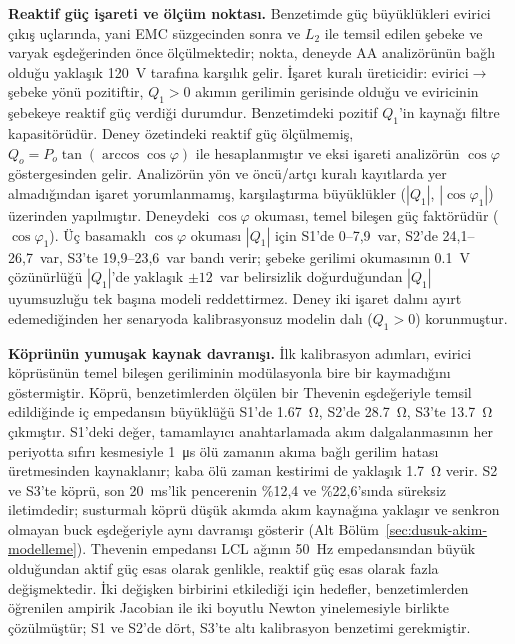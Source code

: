 \textbf{Reaktif güç işareti ve ölçüm noktası.} Benzetimde güç büyüklükleri evirici çıkış uçlarında, yani EMC süzgecinden sonra ve $L_2$ ile temsil edilen şebeke ve varyak eşdeğerinden önce ölçülmektedir; nokta, deneyde AA analizörünün bağlı olduğu yaklaşık \SI{120}{\volt} tarafına karşılık gelir. İşaret kuralı üreticidir: evirici$\rightarrow$şebeke yönü pozitiftir, $Q_1>0$ akımın gerilimin gerisinde olduğu ve eviricinin şebekeye reaktif güç verdiği durumdur. Benzetimdeki pozitif $Q_1$'in kaynağı filtre kapasitörüdür. Deney özetindeki reaktif güç ölçülmemiş, $Q_o=P_o\tan(\arccos\cos\varphi)$ ile hesaplanmıştır ve eksi işareti analizörün $\cos\varphi$ göstergesinden gelir. Analizörün yön ve öncü/artçı kuralı kayıtlarda yer almadığından işaret yorumlanmamış, karşılaştırma büyüklükler ($|Q_1|$, $|\cos\varphi_1|$) üzerinden yapılmıştır. Deneydeki $\cos\varphi$ okuması, temel bileşen güç faktörüdür ($\cos\varphi_1$). Üç basamaklı $\cos\varphi$ okuması $|Q_1|$ için S1'de 0--7,9~var, S2'de 24,1--26,7~var, S3'te 19,9--23,6~var bandı verir; şebeke gerilimi okumasının \SI{0.1}{\volt} çözünürlüğü $|Q_1|$'de yaklaşık $\pm12$~var belirsizlik doğurduğundan $|Q_1|$ uyumsuzluğu tek başına modeli reddettirmez. Deney iki işaret dalını ayırt edemediğinden her senaryoda kalibrasyonsuz modelin dalı ($Q_1>0$) korunmuştur.

\textbf{Köprünün yumuşak kaynak davranışı.} İlk kalibrasyon adımları, evirici köprüsünün temel bileşen geriliminin modülasyonla bire bir kaymadığını göstermiştir. Köprü, benzetimlerden ölçülen bir Thevenin eşdeğeriyle temsil edildiğinde iç empedansın büyüklüğü S1'de \SI{1.67}{\ohm}, S2'de \SI{28.7}{\ohm}, S3'te \SI{13.7}{\ohm} çıkmıştır. S1'deki değer, tamamlayıcı anahtarlamada akım dalgalanmasının her periyotta sıfırı kesmesiyle \SI{1}{\micro\second} ölü zamanın akıma bağlı gerilim hatası üretmesinden kaynaklanır; kaba ölü zaman kestirimi de yaklaşık \SI{1.7}{\ohm} verir. S2 ve S3'te köprü, son \SI{20}{\milli\second}'lik pencerenin \%12,4 ve \%22,6'sında süreksiz iletimdedir; susturmalı köprü düşük akımda akım kaynağına yaklaşır ve senkron olmayan buck eşdeğeriyle aynı davranışı gösterir (Alt Bölüm~\ref{sec:dusuk-akim-modelleme}). Thevenin empedansı LCL ağının \SI{50}{\hertz} empedansından büyük olduğundan aktif güç esas olarak genlikle, reaktif güç esas olarak fazla değişmektedir. İki değişken birbirini etkilediği için hedefler, benzetimlerden öğrenilen ampirik Jacobian ile iki boyutlu Newton yinelemesiyle birlikte çözülmüştür; S1 ve S2'de dört, S3'te altı kalibrasyon benzetimi gerekmiştir.

